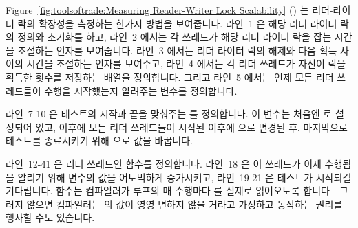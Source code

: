 Figure~\ref{fig:toolsoftrade:Measuring Reader-Writer Lock Scalability}
()
는 리더-라이터 락의 확장성을 측정하는 한가지 방법을 보여줍니다.
라인~1 은 해당 리더-라이터 락의 정의와 초기화를 하고, 라인~2 에서는 각 쓰레드가
해당 리더-라이터 락을 잡는 시간을 조절하는  인자를 보여줍니다.
라인~3 에서는 리더-라이터 락의 해제와 다음 획득 사이의 시간을 조절하는
 인자를 보여주고, 라인~4 에서는 각 리더 쓰레드가 자신이 락을
획득한 횟수를 저장하는  배열을 정의합니다. 그리고 라인~5 에서는
언제 모든 리더 쓰레드들이 수행을 시작했는지 알려주는 
변수를 정의합니다.

라인~7-10 은 테스트의 시작과 끝을 맞춰주는  를 정의합니다.
이 변수는 처음엔  로 설정되어 있고, 이후에 모든 리더 쓰레드들이
시작된 이후에  으로 변경된 후, 마지막으로 테스트를 종료시키기
위해  으로 값을 바꿉니다.

라인~12-41 은 리더 쓰레드인  함수를 정의합니다.
라인~18 은 이 쓰레드가 이제 수행됨을 알리기 위해  변수의
값을 어토믹하게 증가시키고, 라인~19-21 은 테스트가 시작되길 기다립니다.
 함수는 컴파일러가 루프의 매 수행마다  를 실제로
읽어오도록 합니다---그러지 않으면 컴파일러는  의 값이 영영 변하지
않을 거라고 가정하고 동작하는 권리를 행사할 수도 있습니다.


